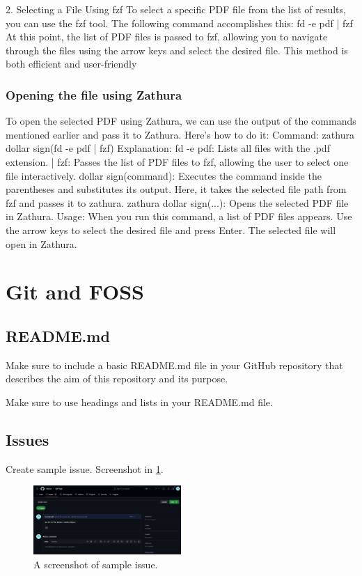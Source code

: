 \documentclass[12pt]{article}
\begin{document}
2. Selecting a File Using fzf
To select a specific PDF file from the list of results, you can use the fzf tool. The following command accomplishes this:
fd -e pdf | fzf
At this point, the list of PDF files is passed to fzf, allowing you to navigate through the files using the arrow keys and select the desired file. This method is both efficient and user-friendly

\subsubsection{Opening the file using Zathura}
To open the selected PDF using Zathura, we can use the output of the commands mentioned earlier and pass it to Zathura. Here’s how to do it:
Command:
zathura dollar sign(fd -e pdf | fzf)
Explanation:
fd -e pdf: Lists all files with the .pdf extension.
| fzf: Passes the list of PDF files to fzf, allowing the user to select one file interactively.
dollar sign(command): Executes the command inside the parentheses and substitutes its output. Here, it takes the selected file path from fzf and passes it to zathura.
zathura dollar sign(...): Opens the selected PDF file in Zathura.
Usage:
When you run this command, a list of PDF files appears. Use the arrow keys to select the desired file and press Enter. The selected file will open in Zathura.

\section{Git and FOSS}
\subsection{README.md}
Make sure to include a basic README.md file in your GitHub repository that describes the aim of this repository and its purpose.

Make sure to use headings and lists in your README.md file.

\subsection{Issues}
Create sample issue. Screenshot in \ref{fig:issue}.
\begin{figure}[htbp]
    \centering
    \includegraphics[width=0.5\textwidth]{pic/Screenshot 2025-01-19 235151.png}
    \caption{A screenshot of sample issue.}
    \label{fig:issue}
\end{figure}
\end{document}
